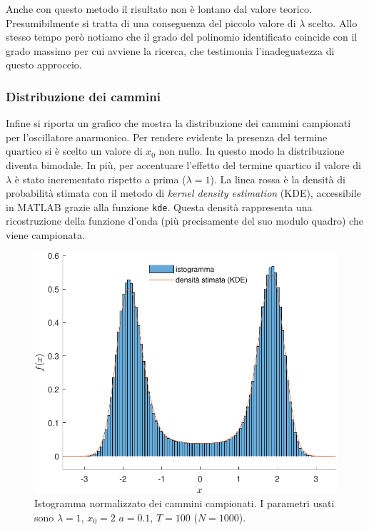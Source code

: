 \documentclass[11pt, a4paper]{article}
\begin{document}
Anche con questo metodo il risultato non è lontano dal valore teorico. Presumibilmente si tratta di una conseguenza del piccolo valore di $\lambda$ scelto.
Allo stesso tempo però notiamo che il grado del polinomio identificato coincide con il grado massimo per cui avviene la ricerca, che testimonia l'inadeguatezza di questo approccio.

\subsubsection{Distribuzione dei cammini}
Infine si riporta un grafico che mostra la distribuzione dei cammini campionati per l'oscillatore anarmonico.
Per rendere evidente la presenza del termine quartico si è scelto un valore di $x_0$ non nullo. In questo modo la distribuzione diventa bimodale.
In più, per accentuare l'effetto del termine quartico il valore di $\lambda$ è stato incrementato rispetto a prima ($\lambda = 1$).
La linea rossa è la densità di probabilità stimata con il metodo di \emph{kernel density estimation} (KDE), accessibile in MATLAB grazie alla funzione \texttt{kde}.
Questa densità rappresenta una ricostruzione della funzione d'onda (più precisamente del suo modulo quadro) che viene campionata.


\begin{figure}[H]
  \centering
  \includegraphics{../plots/qao/final/distr_plot-crop.pdf}
  \caption{Istogramma normalizzato dei cammini campionati. I parametri usati sono $\lambda = 1$, $x_0 = 2$ $a = 0.1$, $T=100$ ($N=1000$).}
\end{figure}


\printbibliography
\end{document}
